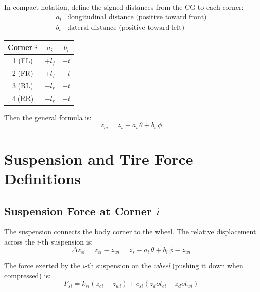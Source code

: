 \documentclass[11pt]{article}
\def\dot#1{#1_dot}%
\begin{document}
In compact notation, define the signed distances from the CG to each corner:
\begin{equation}
\begin{aligned}
a_i &: \text{longitudinal distance (positive toward front)} \\
b_i &: \text{lateral distance (positive toward left)}
\end{aligned}
\end{equation}

\begin{center}
\begin{tabular}{ccc}
\toprule
Corner $i$ & $a_i$ & $b_i$ \\
\midrule
1 (FL) & $+l_f$ & $+t$ \\
2 (FR) & $+l_f$ & $-t$ \\
3 (RL) & $-l_r$ & $+t$ \\
4 (RR) & $-l_r$ & $-t$ \\
\bottomrule
\end{tabular}
\end{center}

Then the general formula is:
\begin{equation}
\boxed{z_{ci} = z_s - a_i\,\theta + b_i\,\phi}
\label{eq:zci_general}
\end{equation}

\section{Suspension and Tire Force Definitions}

\subsection{Suspension Force at Corner $i$}

The suspension connects the body corner to the wheel. The relative displacement across the $i$-th suspension is:
\begin{equation}
\Delta z_{si} = z_{ci} - z_{wi} = z_s - a_i\,\theta + b_i\,\phi - z_{wi}
\label{eq:delta_si}
\end{equation}

The force exerted by the $i$-th suspension on the \emph{wheel} (pushing it down when compressed) is:
\begin{equation}
\boxed{F_{si} = k_{si}(z_{ci} - z_{wi}) + c_{si}(\dot{z}_{ci} - \dot{z}_{wi})}
\label{eq:Fsi}
\end{equation}
\end{document}
